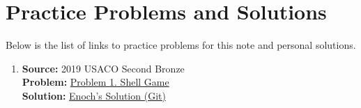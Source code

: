 \documentclass[../../main.tex]{subfiles}
\begin{document}
\section{Practice Problems and Solutions}

Below is the list of links to practice problems for this note
and personal solutions.

\begin{enumerate}
\item
\textbf{Source:} 2019 USACO Second Bronze \\
\textbf{Problem:}
\href{https://usaco.org/index.php?page=viewproblem2&cpid=891}{Problem 1. Shell Game} \\
\textbf{Solution:}
\href{https://github.com/enochyu-official/LibreNotebook/blob/main/src/CS02/CS0202/CS0202.26058-01.cpp}{Enoch's Solution (Git)}
\end{enumerate}
\end{document}
